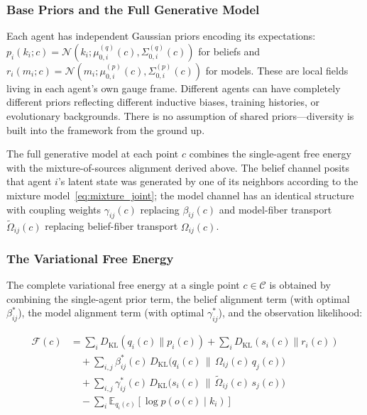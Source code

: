 \documentclass[11pt]{article}
\begin{document}
\subsubsection{Base Priors and the Full Generative Model}

Each agent has independent Gaussian priors encoding its expectations: $p_i(k_i; c) = \mathcal{N}(k_i; \mu_{0,i}^{(q)}(c), \Sigma_{0,i}^{(q)}(c))$ for beliefs and $r_i(m_i; c) = \mathcal{N}(m_i; \mu_{0,i}^{(p)}(c), \Sigma_{0,i}^{(p)}(c))$ for models. These are local fields living in each agent's own gauge frame. Different agents can have completely different priors reflecting different inductive biases, training histories, or evolutionary backgrounds. There is no assumption of shared priors---diversity is built into the framework from the ground up.

The full generative model at each point $c$ combines the single-agent free energy~\cite{Friston2010,Parr2022} with the mixture-of-sources alignment derived above. The belief channel posits that agent $i$'s latent state was generated by one of its neighbors according to the mixture model~\eqref{eq:mixture_joint}; the model channel has an identical structure with coupling weights $\gamma_{ij}(c)$ replacing $\beta_{ij}(c)$ and model-fiber transport $\tilde{\Omega}_{ij}(c)$ replacing belief-fiber transport $\Omega_{ij}(c)$.

\subsubsection{The Variational Free Energy}

The complete variational free energy at a single point $c \in \mathcal{C}$ is obtained by combining the single-agent prior term, the belief alignment term (with optimal $\beta^*_{ij}$), the model alignment term (with optimal $\gamma^*_{ij}$), and the observation likelihood:

\begin{equation}
\begin{aligned}
\mathcal{F}(c) &= \sum_i D_{\mathrm{KL}}(q_i(c) \| p_i(c)) + \sum_i D_{\mathrm{KL}}(s_i(c) \| r_i(c)) \\
&\quad + \sum_{i,j} \beta^*_{ij}(c) \, D_{\mathrm{KL}}\!\big(q_i(c) \,\big\|\, \Omega_{ij}(c)\,q_j(c)\big) \\
&\quad + \sum_{i,j} \gamma^*_{ij}(c) \, D_{\mathrm{KL}}\!\big(s_i(c) \,\big\|\, \tilde{\Omega}_{ij}(c)\,s_j(c)\big) \\
&\quad - \sum_i \mathbb{E}_{q_i(c)}[\log p(o(c) \mid k_i)]
\end{aligned}
\label{eq:pointwise_free_energy}
\end{equation}
\end{document}
